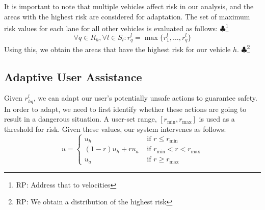 \documentclass[letterpaper, 10 pt, conference]{ieeeconf}  %
\newcommand\NB[1]{$\spadesuit$\footnote{NB: #1}}
\newcommand\RP[1]{$\clubsuit$\footnote{RP: #1}}
\begin{document}
It is important to note that multiple vehicles affect risk in our analysis, and the areas with the highest risk are considered for adaptation. The set of maximum risk values for each lane for all other vehicles is evaluated as follows: \RP{Address that to velocities}
\begin{equation}
    \forall q\in R_h,\forall{l}\in{S_l}: r_{q}^l = \max\{r^l_{1},\ldots,r^l_{q}\}
\end{equation}
Using this, we obtain the areas that have the highest risk for our vehicle $h$. \RP{We obtain a distribution of the highest risk}


\subsection{Adaptive User Assistance}

Given $r_{hq}^l$, we can adapt our user's potentially unsafe actions to guarantee safety. In order to adapt, we need to first identify whether these actions are going to result in a dangerous situation. A user-set range, $[r_\min,r_\max]$ is used as a threshold for risk. Given these values, our system intervenes as follows:
\begin{equation}
    u = \begin{cases}
    u_h & \text{ if } r\leq r_\min \\
    (1-r)u_h + r u_a & \text { if } r_\min<r<r_\max \\
    u_a & \text{ if } r\geq r_\max
    \end{cases}
\end{equation}
\end{document}
